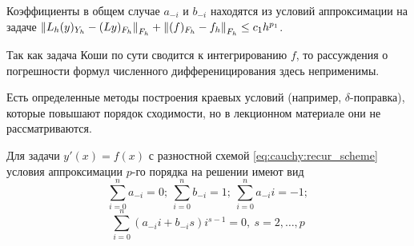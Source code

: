 Коэффициенты в общем случае $a_{-i}$ и $b_{-i}$ находятся из условий
аппроксимации на задаче $\left\lVert L_h(y)_{Y_h} - (Ly)_{F_h}\right\rVert_{F_h}+\left\lVert(f)_{F_h}-f_h\right\rVert_{F_h}\leq c_1h^{p_1}$.

\begin{remark}
  Так как задача Коши по сути сводится к интегрированию $f$, то
  рассуждения о погрешности формул численного дифференицирования здесь неприменимы.
\end{remark}

\begin{remark}
  Есть определенные методы построения краевых условий (например, $\delta$-поправка),
  которые повышают порядок сходимости, но в лекционном материале они не рассматриваются.
\end{remark}

\begin{theorem}
  Для задачи $y'(x)=f(x)$ с разностной схемой \eqref{eq:cauchy:recur_scheme}
  условия аппроксимации $p$-го порядка на решении имеют вид
  \[\sum_{i=0}^na_{-i}=0;\ \sum_{i=0}^nb_{-i}=1;\ \sum_{i=0}^na_{-i}i=-1;\]
  \[\sum_{i=0}^n(a_{-i}i+b_{-i}s)i^{s-1}=0,\ s=2,\ldots,p\]
\end{theorem}
